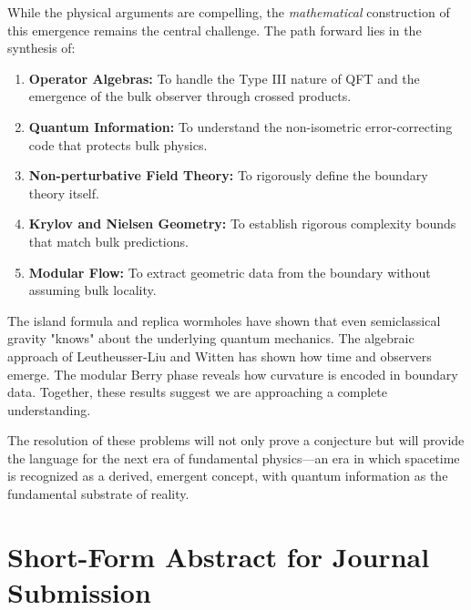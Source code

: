 \documentclass[12pt,a4paper]{article}
\begin{document}
While the physical arguments are compelling, the \textit{mathematical} construction of this emergence remains the central challenge. The path forward lies in the synthesis of:
\begin{enumerate}
    \item \textbf{Operator Algebras:} To handle the Type III nature of QFT and the emergence of the bulk observer through crossed products.
    \item \textbf{Quantum Information:} To understand the non-isometric error-correcting code that protects bulk physics.
    \item \textbf{Non-perturbative Field Theory:} To rigorously define the boundary theory itself.
    \item \textbf{Krylov and Nielsen Geometry:} To establish rigorous complexity bounds that match bulk predictions.
    \item \textbf{Modular Flow:} To extract geometric data from the boundary without assuming bulk locality.
\end{enumerate}

The island formula and replica wormholes have shown that even semiclassical gravity "knows" about the underlying quantum mechanics. The algebraic approach of Leutheusser-Liu and Witten has shown how time and observers emerge. The modular Berry phase reveals how curvature is encoded in boundary data. Together, these results suggest we are approaching a complete understanding.

The resolution of these problems will not only prove a conjecture but will provide the language for the next era of fundamental physics---an era in which spacetime is recognized as a derived, emergent concept, with quantum information as the fundamental substrate of reality.

\appendix
\section{Short-Form Abstract for Journal Submission}\label{app:short-abstract}
\end{document}
